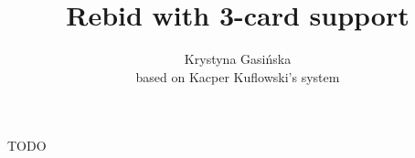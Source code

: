 \documentclass[12pt, a4paper]{article}
\title{Rebid with 3-card support}
\author{Krystyna Gasińska\\based on Kacper Kuflowski's system}
\begin{document}
\maketitle


TODO

\end{document}
